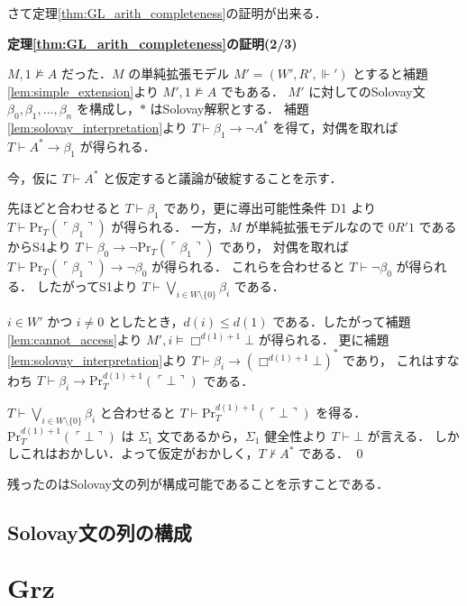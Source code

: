 \documentclass{jsarticle}
\makeatletter
\newcommand*{\Logic}[1]{\mathbf{#1}}
\newcommand*{\LogicGrz}{\Logic{Grz}}
\newcommand*{\Provable}{\mathrm{Pr}}
\theoremstyle{definition}
\renewcommand{\proofname}{証明}
\renewenvironment{proof}[1][\proofname]{\par
    \normalfont 
    \topsep6\p@\@plus6\p@\relax
    \trivlist
    \item\relax
    {\bfseries\gtfamily
    #1\@addpunct{.}}\hspace\labelsep\ignorespaces
    }{%
    \endtrivlist
    \@endpefalse
}
\makeatother
\begin{document}
さて定理\ref{thm:GL_arith_completeness}の証明が出来る．

\begin{proof}[定理\ref{thm:GL_arith_completeness}の証明(2/3)]
	$M,1 \nvDash A$ だった．$M$ の単純拡張モデル $M' = (W', R', \Vdash')$ とすると補題\ref{lem:simple_extension}より $M',1 \nvDash A$ でもある．
	$M'$ に対してのSolovay文 $\beta_0, \beta_1, \dots, \beta_n$ を構成し，$*$ はSolovay解釈とする．
	補題\ref{lem:solovay_interpretation}より $T \vdash \beta_1 \to \lnot A^*$ を得て，対偶を取れば $T \vdash A^* \to \beta_1$ が得られる．

	今，仮に $T \vdash A^*$ と仮定すると議論が破綻することを示す．

	先ほどと合わせると $T \vdash \beta_1$ であり，更に導出可能性条件 D1 より $T \vdash \Provable_T(\ulcorner \beta_1 \urcorner)$ が得られる．
	一方，$M$ が単純拡張モデルなので $0 R' 1$ であるからS4より $T \vdash \beta_0 \to \lnot \Provable_T(\ulcorner \beta_1 \urcorner)$ であり，
	対偶を取れば $T \vdash \Provable_T(\ulcorner \beta_1 \urcorner) \to \lnot \beta_0$ が得られる．
	これらを合わせると $T \vdash \lnot \beta_0$ が得られる．
	したがってS1より $T \vdash \bigvee_{i \in W \setminus \{0\}} \beta_i$ である．

	$i \in W'$ かつ $i \neq 0$ としたとき，$d(i) \leq d(1)$ である．したがって補題 \ref{lem:cannot_access}より
	$M',i \vDash \Box^{d(1) + 1} \bot$ が得られる．
	更に補題\ref{lem:solovay_interpretation}より $T \vdash \beta_i \to (\Box^{d(1) + 1} \bot)^*$ であり，
	これはすなわち $T \vdash \beta_{i} \to \Provable^{d(1) + 1}_T(\ulcorner \bot \urcorner)$ である．

	$T \vdash \bigvee_{i \in W \setminus \{0\}} \beta_i$ と合わせると $T \vdash \Provable^{d(1) + 1}_T(\ulcorner \bot \urcorner)$ を得る．
	$\Provable^{d(1) + 1}_T(\ulcorner \bot \urcorner)$ は $\Sigma_1$ 文であるから，$\Sigma_1$ 健全性より $T \vdash \bot$ が言える．
	しかしこれはおかしい．よって仮定がおかしく，$T \nvdash A^*$ である．
	\qed
\end{proof}

残ったのはSolovay文の列が構成可能であることを示すことである．

\subsection{Solovay文の列の構成}

\section{$\LogicGrz$}

\printbibliography
\end{document}
